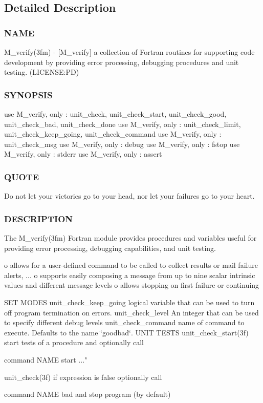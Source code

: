 \subsection{Detailed Description}
\subsubsection*{N\+A\+ME}

M\+\_\+verify(3fm) -\/ \mbox{[}M\+\_\+verify\mbox{]} a collection of Fortran routines for supporting code development by providing error processing, debugging procedures and unit testing. (L\+I\+C\+E\+N\+SE\+:PD) \subsubsection*{S\+Y\+N\+O\+P\+S\+IS}

use M\+\_\+verify, only \+: unit\+\_\+check, unit\+\_\+check\+\_\+start, unit\+\_\+check\+\_\+good, unit\+\_\+check\+\_\+bad, unit\+\_\+check\+\_\+done use M\+\_\+verify, only \+: unit\+\_\+check\+\_\+limit, unit\+\_\+check\+\_\+keep\+\_\+going, unit\+\_\+check\+\_\+command use M\+\_\+verify, only \+: unit\+\_\+check\+\_\+msg use M\+\_\+verify, only \+: debug use M\+\_\+verify, only \+: fstop use M\+\_\+verify, only \+: stderr use M\+\_\+verify, only \+: assert

\subsubsection*{Q\+U\+O\+TE}

Do not let your victories go to your head, nor let your failures go to your heart.

\subsubsection*{D\+E\+S\+C\+R\+I\+P\+T\+I\+ON}

The M\+\_\+verify(3fm) Fortran module provides procedures and variables useful for providing error processing, debugging capabilities, and unit testing.

o allows for a user-\/defined command to be called to collect results or mail failure alerts, ... o supports easily composing a message from up to nine scalar intrinsic values and different message levels o allows stopping on first failure or continuing

S\+ET M\+O\+D\+ES unit\+\_\+check\+\_\+keep\+\_\+going logical variable that can be used to turn off program termination on errors. unit\+\_\+check\+\_\+level An integer that can be used to specify different debug levels unit\+\_\+check\+\_\+command name of command to execute. Defaults to the name \char`\"{}goodbad\char`\"{}. U\+N\+IT T\+E\+S\+TS unit\+\_\+check\+\_\+start(3f) start tests of a procedure and optionally call \begin{DoxyVerb}                      command NAME start ..."
\end{DoxyVerb}
 unit\+\_\+check(3f) if expression is false optionally call \begin{DoxyVerb}                      command NAME bad
                   and stop program (by default)
\end{DoxyVerb}


